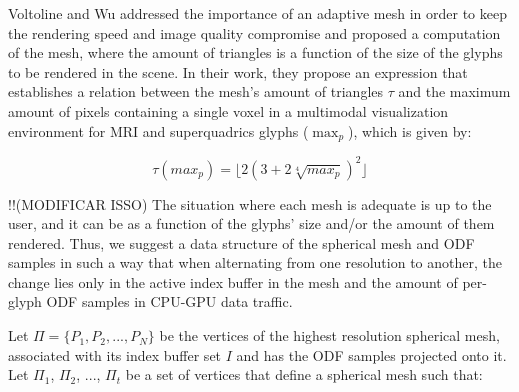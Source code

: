 \documentclass[twoside,twocolumn,10pt]{article}
\begin{document}
Voltoline and Wu \cite{voltoline2021} addressed the importance of an adaptive mesh in order to keep the rendering speed and image quality compromise and proposed a computation of the mesh, where the amount of triangles is a function of the size of the glyphs to be rendered in the scene. In their work, they propose an expression that establishes a relation between the mesh's amount of triangles $\tau$ and the maximum amount of pixels containing a single voxel  in a multimodal visualization environment for MRI and superquadrics glyphs ($\max_p$), which is given by:

\begin{equation}
    \tau(max_p) = \lfloor 2(3 + 2\sqrt[4]{max_p})^2 \rfloor
\end{equation}



!!(MODIFICAR ISSO) The situation where each mesh is adequate is up to the user, and it can be as a function of the glyphs' size \cite{voltoline2021} and/or the amount of them rendered. Thus, we suggest a data structure of the spherical mesh and ODF samples in such a way that when alternating from one resolution to another, the change lies only in the active index buffer in the mesh and the amount of per-glyph ODF samples in CPU-GPU data traffic.

Let $\Pi = \{P_1, P_2, ..., P_{N}\}$ be the vertices of the highest resolution spherical mesh, associated with its index buffer set $I$ and has the ODF samples projected onto it. Let $\Pi_{1}$, $\Pi_{2}$, ..., $\Pi_{t}$ be a set of vertices that define a spherical mesh such that:
\end{document}
